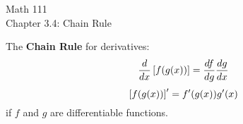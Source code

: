 \documentclass[11pt]{article}
\begin{document}
\begin{center}
\Large
\rm{Math 111}
\\
\rm{Chapter 3.4:  Chain Rule}
\\
\end{center}
\vspace{0.2in}

The {\bf Chain Rule } for derivatives:
\begin{displaymath}
  \frac{d}{dx}\left[f(g(x))  \right] = \frac{df}{dg}\frac{dg}{dx} \\
  \end{displaymath}
\begin{displaymath}
  \left[f(g(x))  \right]' = f'(g(x))g'(x)\\
  \end{displaymath}
if $f$ and $g$ are differentiable functions.



\vspace{0.5in}
\end{document}
